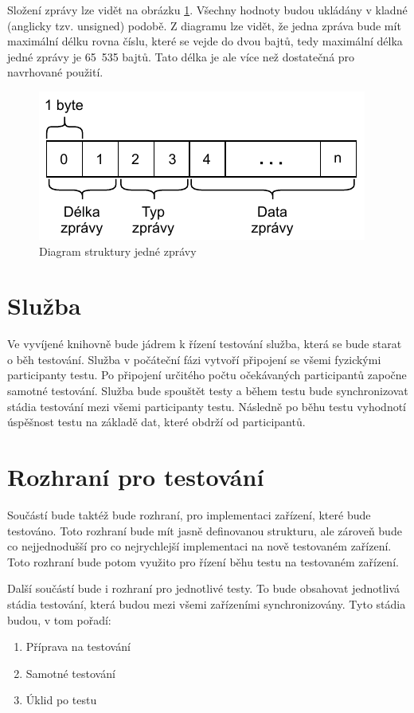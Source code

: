 Složení zprávy lze vidět na obrázku \ref{fig:message}. Všechny hodnoty budou ukládány v kladné (anglicky tzv. unsigned) podobě. Z diagramu lze vidět, že jedna zpráva bude mít maximální délku rovna číslu, které se vejde do dvou bajtů, tedy maximální délka jedné zprávy je 65~535 bajtů. Tato délka je ale více než dostatečná pro navrhované použití.  

\begin{figure}[htbp]
    \centering 
    \includegraphics{assets/img/message.pdf}
    \caption{Diagram struktury jedné zprávy}
    \label{fig:message}
\end{figure}


\section{Služba}
Ve vyvíjené knihovně bude jádrem k řízení testování služba, která se bude starat o běh testování. Služba v počáteční fázi vytvoří připojení se všemi fyzickými participanty testu. Po připojení určitého počtu očekávaných participantů započne samotné testování. Služba bude spouštět testy a během testu bude synchronizovat stádia testování mezi všemi participanty testu. Následně po běhu testu vyhodnotí úspěšnost testu na základě dat, které obdrží od participantů. 


\section{Rozhraní pro testování}
Součástí bude taktéž bude rozhraní, pro implementaci zařízení, které bude testováno. Toto rozhraní bude mít jasně definovanou  strukturu, ale zároveň bude co nejjednodušší pro co nejrychlejší implementaci na nově testovaném zařízení. Toto rozhraní bude potom využito pro řízení běhu testu na testovaném zařízení. 

Další součástí bude i rozhraní pro jednotlivé testy. To bude obsahovat jednotlivá stádia testování, která budou mezi všemi zařízeními synchronizovány. Tyto stádia budou, v tom pořadí:
\begin{enumerate}
    \item Příprava na testování
    \item Samotné testování
    \item Úklid po testu
\end{enumerate}



